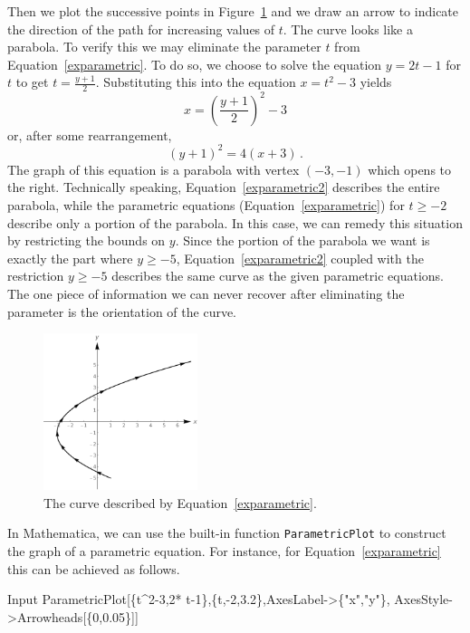 Then we plot the successive points in Figure~\ref{fig_parametric_14} and we draw an arrow to indicate the direction of the path for increasing values of $t$. The curve looks like a parabola.  To verify this we may eliminate the parameter $t$ from Equation~\eqref{exparametric}.  To do so, we choose to solve the equation $y = 2t-1$ for $t$ to get $t = \frac{y+1}{2}$.  Substituting this into the equation $x = t^2 -3$ yields 
$$x = \left(\frac{y+1}{2}\right)^2 - 3$$
 or, after some rearrangement, 
\begin{equation}
(y+1)^2 = 4(x+3)\,.
\label{exparametric2}
\end{equation} 
The graph of this equation is a parabola with vertex $(-3,-1)$ which opens to the right. Technically speaking, Equation~\eqref{exparametric2} describes the entire parabola, while the parametric equations (Equation~\eqref{exparametric}) for $t \geq -2$ describe only a portion of the parabola.  In this case, we can remedy this situation by restricting the bounds on $y$.  Since the portion of the parabola we want is exactly the part where $y \geq -5$, Equation~\eqref{exparametric2} coupled with the restriction $y \geq -5$ describes the same curve as the given parametric equations.  The one piece of information we can never recover after eliminating the parameter is the orientation of the curve.


\begin{figure}[h]
	\begin{center}
			\includegraphics[width=0.4\textwidth]{fig_parametric_14}
	\caption{The curve described by Equation~\eqref{exparametric}. }
	\label{fig_parametric_14}
	\end{center}
\end{figure}

\ifmathematica
In Mathematica, we can use the built-in function \lstinline{ParametricPlot} to construct the graph of a parametric equation. For instance, for Equation~\eqref{exparametric} this can be achieved as follows. 
\begin{mdframed}[default,backgroundcolor=gray!40,roundcorner=8pt]
\begin{mmaCell}[morefunctionlocal={t},moredefined={Arrowheads}]{Input}
  ParametricPlot[\{t^2-3,2* t-1\},\{t,-2,3.2\},AxesLabel->\{"x","y"\},
	 AxesStyle->Arrowheads[\{0,0.05\}]]
\end{mmaCell}
\end{mdframed}
\fi

